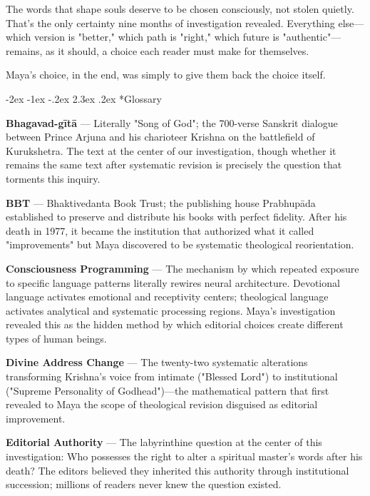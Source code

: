 \documentclass[12pt,twoside]{book}
\makeatletter
\def\cleardoublepage{\clearpage\if@twoside \ifodd\c@page\else\hbox{}\thispagestyle{empty}\newpage\if@twocolumn\hbox{}\newpage\fi\fi\fi}
\renewcommand\section{\@startsection{section}{1}{\z@}%
{-2ex \@plus -1ex \@minus -.2ex}%
{2.3ex \@plus.2ex}%
{\normalfont\Large\bfseries}}
\makeatother
\begin{document}
The words that shape souls deserve to be chosen consciously, not stolen quietly. That's the only certainty nine months of investigation revealed. Everything else—which version is "better," which path is "right," which future is "authentic"—remains, as it should, a choice each reader must make for themselves.

Maya's choice, in the end, was simply to give them back the choice itself.

\cleardoublepage
\section*{Glossary}
\thispagestyle{sectionopening}

\textbf{Bhagavad-gītā} — Literally "Song of God"; the 700-verse Sanskrit dialogue between Prince Arjuna and his charioteer Krishna on the battlefield of Kurukshetra. The text at the center of our investigation, though whether it remains the same text after systematic revision is precisely the question that torments this inquiry.

\textbf{BBT} — Bhaktivedanta Book Trust; the publishing house Prabhupāda established to preserve and distribute his books with perfect fidelity. After his death in 1977, it became the institution that authorized what it called "improvements" but Maya discovered to be systematic theological reorientation.

\textbf{Consciousness Programming} — The mechanism by which repeated exposure to specific language patterns literally rewires neural architecture. Devotional language activates emotional and receptivity centers; theological language activates analytical and systematic processing regions. Maya's investigation revealed this as the hidden method by which editorial choices create different types of human beings.

\textbf{Divine Address Change} — The twenty-two systematic alterations transforming Krishna's voice from intimate ("Blessed Lord") to institutional ("Supreme Personality of Godhead")—the mathematical pattern that first revealed to Maya the scope of theological revision disguised as editorial improvement.

\textbf{Editorial Authority} — The labyrinthine question at the center of this investigation: Who possesses the right to alter a spiritual master's words after his death? The editors believed they inherited this authority through institutional succession; millions of readers never knew the question existed.
\end{document}
